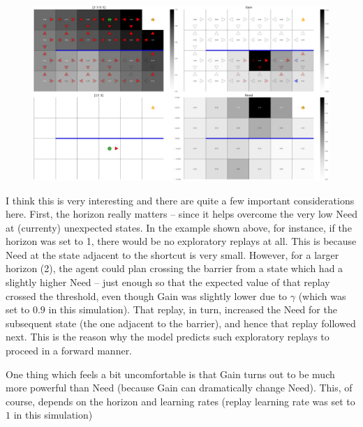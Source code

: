 \documentclass{article}
\begin{document}
\begin{figure}[ht!]
    \centering
    \includegraphics[width=1\textwidth]{../data/plots/move_3001_5.png}
\end{figure}

\clearpage

I think this is very interesting and there are quite a few important considerations here. First, the horizon really 
matters -- since it helps overcome the very low Need at (currenty) unexpected states. In the example shown above, 
for instance, if the horizon was set to 1, there would be no exploratory replays at all. This is because Need at the 
state adjacent to the shortcut is very small. However, for a larger horizon (2), the agent could plan crossing the 
barrier from a state which had a slightly higher Need -- just enough so that the expected value of that replay crossed 
the threshold, even though Gain was slightly lower due to $\gamma$ (which was set to $0.9$ in this simulation). That replay, in turn, 
increased the Need for the subsequent state (the one adjacent to the barrier), and hence that replay followed next. This 
is the reason why the model predicts such exploratory replays to proceed in a forward manner. 

\bigbreak

One thing which feels a bit uncomfortable is that Gain turns out to be much more powerful than Need (because Gain can dramatically change 
Need). This, of course, depends on the horizon and learning rates (replay learning rate was set to $1$ in this simulation)
\end{document}
